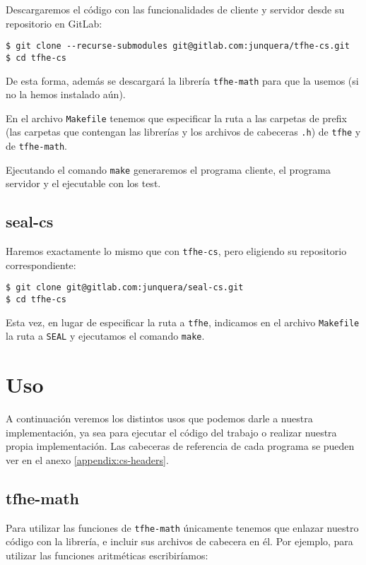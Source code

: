 Descargaremos el código con las funcionalidades de cliente y servidor desde su repositorio en GitLab:

\begin{verbatim}
$ git clone --recurse-submodules git@gitlab.com:junquera/tfhe-cs.git
$ cd tfhe-cs
\end{verbatim}

De esta forma, además se descargará la librería \verb|tfhe-math| para que la usemos (si no la hemos instalado aún).

En el archivo \verb|Makefile| tenemos que especificar la ruta a las carpetas de prefix (las carpetas que contengan las librerías y los archivos de cabeceras \verb|.h|) de \verb|tfhe| y de \verb|tfhe-math|.

Ejecutando el comando \verb|make| generaremos el programa cliente, el programa servidor y el ejecutable con los test.

\subsection{seal-cs}

Haremos exactamente lo mismo que con \verb|tfhe-cs|, pero eligiendo su repositorio correspondiente:

\begin{verbatim}
$ git clone git@gitlab.com:junquera/seal-cs.git
$ cd tfhe-cs
\end{verbatim}

Esta vez, en lugar de especificar la ruta a \verb|tfhe|, indicamos en el archivo \verb|Makefile| la ruta a \verb|SEAL| y ejecutamos el comando \verb|make|.

\section{Uso}

A continuación veremos los distintos usos que podemos darle a nuestra implementación, ya sea para ejecutar el código del trabajo o realizar nuestra propia implementación. Las cabeceras de referencia de cada programa se pueden ver en el anexo \ref{appendix:cs-headers}.

\subsection{tfhe-math}

Para utilizar las funciones de \verb|tfhe-math| únicamente tenemos que enlazar nuestro código 
con la librería, e incluir sus archivos de cabecera en él. Por ejemplo, para utilizar las funciones aritméticas escribiríamos:

